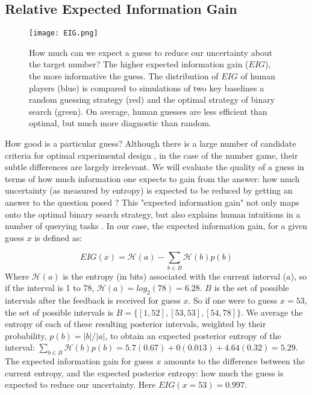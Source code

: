 \documentclass[10pt,letterpaper]{article}
\begin{document}
\subsection{Relative Expected Information Gain}


\begin{figure}[h]
    \texttt{[image: EIG.png]}
    \vspace{-8mm}
    \caption{How much can we expect a guess to reduce our uncertainty about the target number? The higher expected information gain ($EIG$), the more informative the guess. The distribution of $EIG$ of human players (blue) is compared to simulations of two key baselines a random guessing strategy (red) and the optimal strategy of binary search (green). On average, human guesses are less efficient than optimal, but much more diagnostic than random.
}
    \label{fig:EIG-histogram}
    \vspace{-2mm}
\end{figure}

How good is a particular guess?  
Although there is a large number of candidate criteria for optimal experimental design \cite{NelsonFindingUsefulQuestions2005, coenen2019asking}, in the case of the number game, their subtle differences are largely irrelevant.  
We will evaluate the quality of a guess in terms of how much information one expects to gain from the answer: how much uncertainty (as measured by entropy) is expected to be reduced by getting an answer to the question posed  \cite{ShannonMathematicalTheoryCommunication1948}?  
This "expected information gain" \cite{LindleyMeasureInformationProvided1956,FedorovTheoryoptimalexperiments1972} not only maps onto the optimal binary search strategy, but also explains human intuitions in a number of querying tasks \cite{NelsonFindingUsefulQuestions2005}.\footnotemark
In our case, the expected information gain, for a given guess $x$ is defined as:

\begin{equation}
    EIG(x) = \mathcal{H}(a) - \sum_{b \in B} \mathcal{H}(b) p(b)
\end{equation}
Where $\mathcal{H}(a)$ is the entropy (in bits) associated with the current interval ($a$), so if the interval is 1 to 78, $\mathcal{H}(a) = log_2(78) = 6.28$.
$B$ is the set of possible intervals after the feedback is received for guess $x$.  So if one were to guess $x=53$, the set of possible intervals is $B = \{[1, 52], [53,53], [54, 78]\}$.  
We average the entropy of each of these resulting posterior intervals, weighted by their probability, $p(b) = |b|/|a|$, to obtain an expected posterior entropy of the interval: $\sum_{b \in B} \mathcal{H}(b) p(b) = 5.7(0.67) + 0(0.013) + 4.64(0.32) = 5.29$.
The expected information gain for guess $x$ amounts to the difference between the current entropy, and the expected posterior entropy: how much the guess is expected to reduce our uncertainty. Here $EIG(x=53)=0.997$. 
\end{document}
